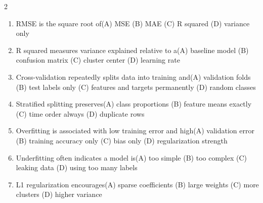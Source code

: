 \documentclass[a4paper]{article}
\begin{document}
\begin{multicols*}{2}
\begin{enumerate}[resume]
\item RMSE is the square root of\newline\hspace*{0.6em}(A) MSE \quad (B) MAE \newline\hspace*{0.6em}(C) R squared \quad (D) variance only
\item R squared measures variance explained relative to a\newline\hspace*{0.6em}(A) baseline model \quad (B) confusion matrix \newline\hspace*{0.6em}(C) cluster center \quad (D) learning rate
\item Cross-validation repeatedly splits data into training and\newline\hspace*{0.6em}(A) validation folds \quad (B) test labels only \newline\hspace*{0.6em}(C) features and targets permanently \quad (D) random classes
\item Stratified splitting preserves\newline\hspace*{0.6em}(A) class proportions \quad (B) feature means exactly \newline\hspace*{0.6em}(C) time order always \quad (D) duplicate rows
\item Overfitting is associated with low training error and high\newline\hspace*{0.6em}(A) validation error \quad (B) training accuracy only \newline\hspace*{0.6em}(C) bias only \quad (D) regularization strength
\item Underfitting often indicates a model is\newline\hspace*{0.6em}(A) too simple \quad (B) too complex \newline\hspace*{0.6em}(C) leaking data \quad (D) using too many labels
\item L1 regularization encourages\newline\hspace*{0.6em}(A) sparse coefficients \quad (B) large weights \newline\hspace*{0.6em}(C) more clusters \quad (D) higher variance

\end{enumerate}
\end{multicols*}
\end{document}
